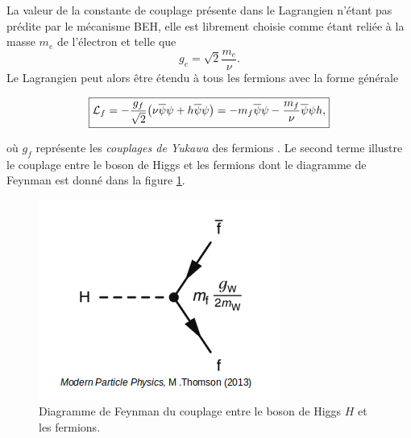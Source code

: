         La valeur de la constante de couplage présente dans le Lagrangien n'étant pas prédite par le mécanisme BEH, elle est librement choisie comme étant reliée à la masse $m_e$ de l'électron et telle que $$g_e=\sqrt{2}\frac{m_e}{\nu}.$$ Le Lagrangien peut alors être étendu à tous les fermions avec la forme générale

        \begin{equation}
        \boxed{
            \mathcal{L}_f=-\frac{g_f}{\sqrt{2}}\bigl(\nu\overline{\psi}\psi+h\overline{\psi}\psi\bigr) \vspace{5pt}=-m_f\overline{\psi}\psi-\frac{m_f}{\nu}\overline{\psi}\psi h
        ,}
        \label{yukawacoupling}
        \end{equation}

        où $g_f$ représente les \textit{couplages de Yukawa} des fermions \cite{Yukawa}. Le second terme illustre le couplage entre le boson de Higgs et les fermions dont le diagramme de Feynman est donné dans la figure \ref{higgsfcoupling}.



        \begin{figure}
        \centering
            \includegraphics[scale=0.45]{Chapitre2/Images/higgsfcoupling.png} 
            \caption{Diagramme de Feynman du couplage entre le boson de Higgs $H$ et les fermions.}
        \label{higgsfcoupling}
        \end{figure}
        
